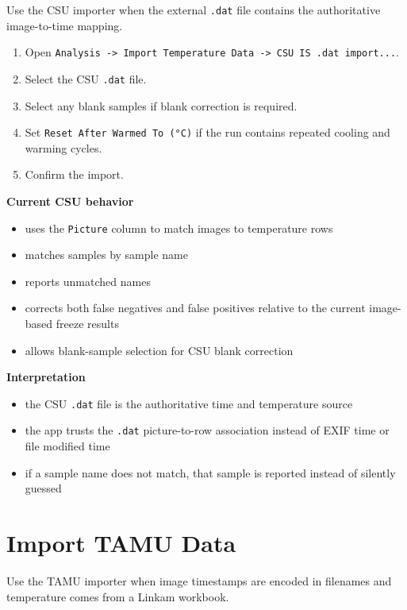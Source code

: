 \documentclass[
  9pt,
  letterpaper,
  oneside,
  open=any,
  DIV=15,
  parskip=half-,
  headings=big,
  numbers=noenddot
]{scrbook}
\newcommand{\manuallead}[1]{%
  \vspace{0.15em}%
  {\sffamily\bfseries\color{ManualBlue}#1}\par\nobreak\vspace{0.05em}%
}
\begin{document}
Use the CSU importer when the external \texttt{.dat} file contains the authoritative image-to-time mapping.


\begin{enumerate}[leftmargin=*,itemsep=0.35em,topsep=0.4em]
\item Open \texttt{Analysis -> Import Temperature Data -> CSU IS .dat import...}.
\item Select the CSU \texttt{.dat} file.
\item Select any blank samples if blank correction is required.
\item Set \texttt{Reset After Warmed To (°C)} if the run contains repeated cooling and warming cycles.
\item Confirm the import.
\end{enumerate}

\manuallead{Current CSU behavior}

\begin{itemize}[leftmargin=*,itemsep=0.35em,topsep=0.4em]
\item uses the \texttt{Picture} column to match images to temperature rows
\item matches samples by sample name
\item reports unmatched names
\item corrects both false negatives and false positives relative to the current image-based freeze results
\item allows blank-sample selection for CSU blank correction
\end{itemize}

\manuallead{Interpretation}

\begin{itemize}[leftmargin=*,itemsep=0.35em,topsep=0.4em]
\item the CSU \texttt{.dat} file is the authoritative time and temperature source
\item the app trusts the \texttt{.dat} picture-to-row association instead of EXIF time or file modified time
\item if a sample name does not match, that sample is reported instead of silently guessed
\end{itemize}

\section{Import TAMU Data}

Use the TAMU importer when image timestamps are encoded in filenames and temperature comes from a Linkam workbook.
\end{document}

